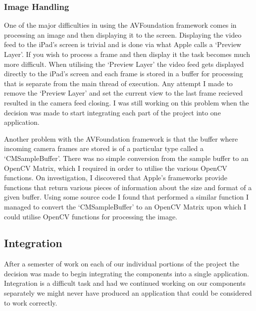 \documentclass{article}
\begin{document}
\subsubsection{Image Handling}

One of the major difficulties in using the AVFoundation framework comes in processing an image and then displaying it to the screen. Displaying the video feed to the iPad's screen is trivial and is done via what Apple calls a `Preview Layer'. If you wish to process a frame and then display it the task becomes much more difficult. When utilising the `Preview Layer' the video feed gets displayed directly to the iPad's screen and each frame is stored in a buffer for processing that is separate from the main thread of execution. %
 Any attempt I made to remove the `Preview Layer' and set the current view to the last frame recieved resulted in the camera feed closing. 
 I was still working on this problem when the decision was made to start integrating each part of the project into one application.

Another problem with the AVFoundation framework is that the buffer where incoming camera frames are stored is of a particular type called a `CMSampleBuffer'. There was no simple conversion from the sample buffer to an OpenCV Matrix, which I required in order to utilise the various OpenCV functions. On investigation, I discovered that Apple's frameworks provide functions that return various pieces of information about the size and format of a given buffer. Using some source code I found that performed a similar function %
I managed to convert the `CMSampleBuffer' to an OpenCV Matrix upon which I could utilise OpenCV functions for processing the image.


\subsection{Integration}

After a semester of work on each of our individual portions of the project the decision was made to begin integrating the components into a single application. Integration is a difficult task and had we continued working on our components separately we might never have produced an application that could be considered to work correctly.
\end{document}
